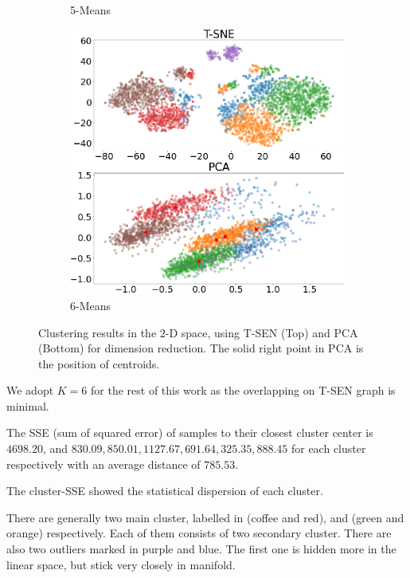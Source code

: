 \documentclass[11pt,twocolumn,letterpaper]{article}
\begin{document}
\begin{figure}
\begin{subfigure}[b]{0.23\textwidth}
         \caption{5-Means}
         \label{fig:cluster:5means}
     \end{subfigure}
     \hfill
     \begin{subfigure}[b]{0.23\textwidth}
         \centering
         \includegraphics[width=\textwidth]{assests/6-means.png}
         \caption{6-Means}
         \label{fig:cluster:6means}
     \end{subfigure}
        \caption{Clustering results in the $2$-D space, using T-SEN (Top) and PCA (Bottom) for dimension reduction. The solid right point in PCA is the position of centroids.}
        \label{fig:cluster}
\end{figure}

We adopt $K=6$ for the rest of this work as the overlapping on T-SEN graph is minimal.

The SSE (sum of squared error) of samples to their closest cluster center is $4698.20$, and $830.09, 850.01, 1127.67, 691.64, 325.35, 888.45$ for each cluster respectively with an average distance of $785.53$.

The cluster-SSE showed the statistical dispersion of each cluster.

There are generally two main cluster, labelled in (coffee and red), and (green and orange) respectively.
Each of them consists of two secondary cluster.
There are also two outliers marked in purple and blue.
The first one is hidden more in the linear space, but stick very closely in manifold.
\end{document}
